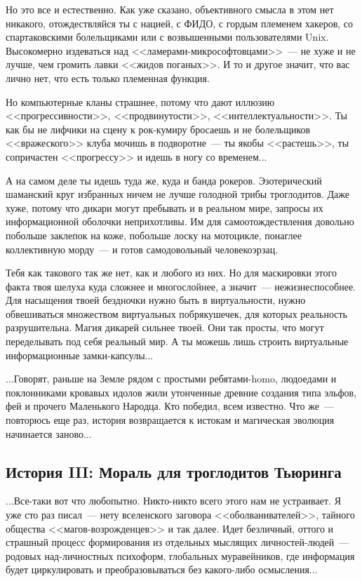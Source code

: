 \documentclass{scrbook}
\newcommand{\flqq}{<<}
\newcommand{\frqq}{>>}
\newcommand{\mdash}{~--- }
\newcommand{\essaysection}[1]{\subsection*{#1}\nopagebreak}
\begin{document}
Но это все и естественно. Как уже сказано, объективного смысла в этом нет никакого, отождествляйся ты с нацией, с ФИДО, с гордым племенем хакеров, со спартаковскими болельщиками или с возвышенными пользователями Unix. Высокомерно издеваться над {\flqq}ламерами-микрософтовцами{\frqq}{\mdash}не хуже и не лучше, чем громить лавки {\flqq}жидов поганых{\frqq}. И то и другое значит, что вас лично нет, что есть только племенная функция.

Но компьютерные кланы страшнее, потому что дают иллюзию {\flqq}прогрессивности{\frqq}, {\flqq}продвинутости{\frqq}, {\flqq}интеллектуальности{\frqq}. Ты как бы не лифчики на сцену к рок-кумиру бросаешь и не болельщиков {\flqq}вражеского{\frqq} клуба мочишь в подворотне{\mdash}ты якобы {\flqq}растешь{\frqq}, ты сопричастен {\flqq}прогрессу{\frqq} и идешь в ногу со временем...

А на самом деле ты идешь туда же, куда и банда рокеров. Эзотерический шаманский круг избранных ничем не лучше голодной трибы троглодитов. Даже хуже, потому что дикари могут пребывать и в реальном мире, запросы их информационной оболочки неприхотливы. Им для самоотождествления довольно побольше заклепок на коже, побольше лоску на мотоцикле, понаглее коллективную морду{\mdash}и готов самодовольный человекоэрзац.

Тебя как такового так же нет, как и любого из них. Но для маскировки этого факта твоя шелуха куда сложнее и многослойнее, а значит{\mdash}нежизнеспособнее. Для насыщения твоей бездночки нужно быть в виртуальности, нужно обвешиваться множеством виртуальных побрякушечек, для которых реальность разрушительна. Магия дикарей сильнее твоей. Они так просты, что могут переделывать под себя реальный мир. А ты можешь лишь строить виртуальные информационные замки-капсулы...

...Говорят, раньше на Земле рядом с простыми ребятами-homo, людоедами и поклонниками кровавых идолов жили утонченные древние создания типа эльфов, фей и прочего Маленького Народца. Кто победил, всем известно. Что же{\mdash}повторюсь еще раз, история возвращается к истокам и магическая эволюция начинается заново...

\essaysection{История III: Мораль для троглодитов Тьюринга}

...Все-таки вот что любопытно. Никто-никто всего этого нам не устраивает. Я уже сто раз писал{\mdash}нету вселенского заговора {\flqq}оболванивателей{\frqq}, тайного общества {\flqq}магов-возрожденцев{\frqq} и так далее. Идет безличный, оттого и страшный процесс формирования из отдельных мыслящих личностей-людей{\mdash}родовых над-личностных психоформ, глобальных муравейников, где информация будет циркулировать и преобразовываться без какого-либо осмысления...
\end{document}
